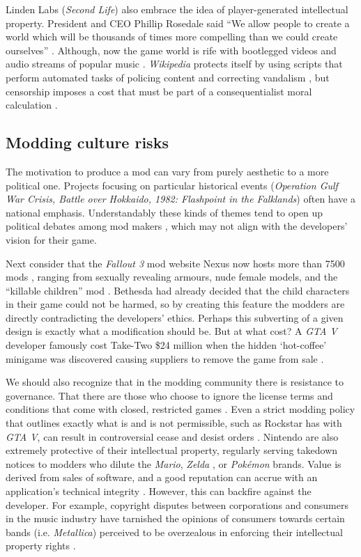 \documentclass{scrartcl}
\begin{document}
Linden Labs (\textit{Second Life}) also embrace the idea of player-generated intellectual property. President and CEO Phillip Rosedale said ``We allow people to create a world which will be thousands of times more compelling than we could create ourselves'' \cite{herman2006your}. Although, now the game world is rife with bootlegged videos and audio streams of popular music \cite{herman2006your}. \textit{Wikipedia} protects itself by using scripts that perform automated tasks of policing content and correcting vandalism \cite{hong2014becoming}, but censorship imposes a cost that must be part of a consequentialist moral calculation \cite{schulzke2010defending}.

\subsection*{Modding culture risks}

The motivation to produce a mod can vary from purely aesthetic to a more political one. Projects focusing on particular historical events (\textit{Operation Gulf War Crisis, Battle over Hokkaido, 1982: Flashpoint in the Falklands}) often have a national emphasis. Understandably these kinds of themes tend to open up political debates among mod makers \cite{sotamaa2010game}, which may not align with the developers' vision for their game.

Next consider that the \textit{Fallout 3} mod website Nexus now hosts more than 7500 mods \cite{bostan2010explorations}, ranging from sexually revealing armours, nude female models, and the ``killable children'' mod \cite{bostan2010explorations}. Bethesda had already decided that the child characters in their game could not be harmed, so by creating this feature the modders are directly contradicting the developers' ethics. Perhaps this subverting of a given design is exactly what a modification should be. But at what cost? A \textit{GTA V} developer famously cost Take-Two {\$}24 million when the hidden `hot-coffee' minigame was discovered causing suppliers to remove the game from sale \cite{hotcoffee1}.

We should also recognize that in the modding community there is resistance to governance. That there are those who choose to ignore the license terms and conditions that come with closed, restricted games \cite{scacchi2010computer}. Even a strict modding policy that outlines exactly what is and is not permissible, such as Rockstar has with \textit{GTA V}, can result in controversial cease and desist orders \cite{gta1}. Nintendo are also extremely protective of their intellectual property, regularly serving takedown notices to modders who dilute the \textit{Mario}, \textit{Zelda} \cite{nintendo1}, or \textit{Pok{\'e}mon} \cite{pokemon1} brands. Value is derived from sales of software, and a good reputation can accrue with an application's technical integrity \cite{herman2006your}. However, this can backfire against the developer. For example, copyright disputes between corporations and consumers in the music industry have tarnished the opinions of consumers towards certain bands (i.e. \textit{Metallica}) perceived to be overzealous in enforcing their intellectual property rights \cite{herman2006your}. 
\end{document}
